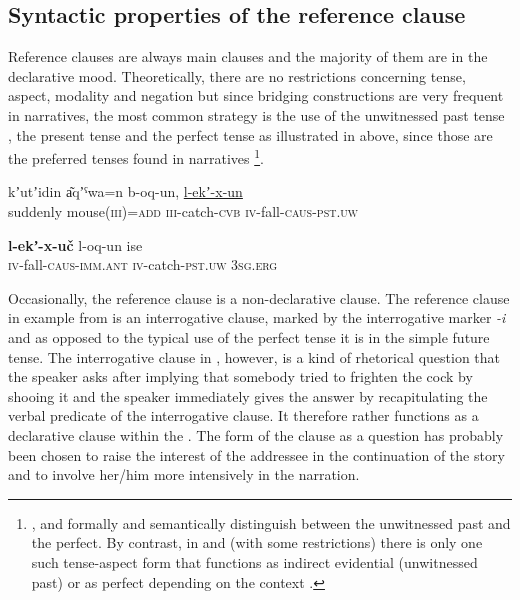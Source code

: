 \documentclass[output=paper]{LSP/langsci}
\begin{document}
\subsection{Syntactic properties of the reference clause}
\label{ssec:Syntactic properties of the reference clause} 
Reference clauses are always main clauses and the majority of them are in the declarative mood. Theoretically, there are no restrictions concerning tense, aspect, modality and negation but since bridging constructions are very frequent in narratives, the most common strategy is the use of the unwitnessed past tense , the present tense  and the perfect tense as illustrated in  above, since those are the preferred tenses found in  narratives \footnote{,  and  formally and semantically distinguish between the unwitnessed past and the perfect. By contrast, in  and  (with some restrictions) there is only one such tense-aspect form that functions as indirect evidential (unwitnessed past) or as perfect depending on the context \citep{Khalilova.2011}.}.  

\begin{exe}
	\ex	\label{ex:3ab}
	\begin{xlist}
		\ex	\label{ex:3a}
		\gll	 kʼutʼidin 	a͂qʼˤwa=n  		b-oq-un, 			\underline{l-ekʼ-x-un}\\
			suddenly 	mouse(\textsc{iii})=\textsc{add}		\textsc{iii}-catch-\textsc{cvb} 	\textsc{iv}-fall-\textsc{caus-pst.uw}\\
		\glt	{}

		\ex	\label{ex:3b}
		\gll		\textbf{l-ekʼ-x-uč}  				l-oq-un   			ise\\
			\textsc{iv}-fall-\textsc{caus-imm.ant} 	\textsc{iv}-catch-\textsc{pst.uw} 	\textsc{3sg.erg}\\
		\glt	{}
	\end{xlist}
\end{exe}

Occasionally, the reference clause is a non-declarative clause. The reference clause in example  from  is an interrogative clause, marked by the interrogative marker \textit{-i} and as opposed to the typical use of the perfect tense it is in the simple future tense. The interrogative clause in , however, is a kind of rhetorical question that the speaker asks after implying that somebody tried to frighten the cock by shooing it and the speaker immediately gives the answer by recapitulating the verbal predicate of the interrogative clause. It therefore rather functions as a declarative clause within the . The form of the clause as a question has probably been chosen to raise the interest of the addressee in the continuation of the story and to involve her/him more intensively in the narration.
\end{document}
